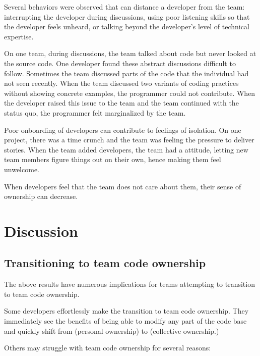 Several behaviors were observed that can distance a developer from the team: interrupting the developer during discussions, using poor listening skills so that the developer feels unheard, or talking beyond the developer's level of technical expertise. 


On one team, during discussions, the team talked about code but never looked at the source code. One developer found these abstract discussions difficult to follow. Sometimes the team discussed parts of the code that the individual had not seen recently. When the team discussed two variants of coding practices without showing concrete examples, the programmer could not contribute. When the developer raised this issue to the team and the team continued with the status quo, the programmer felt marginalized by the team.


Poor onboarding of developers can contribute to feelings of isolation. On one project, there was a time crunch and the team was feeling the pressure to deliver stories. When the team added developers, the team had a  attitude, letting new team members figure things out on their own, hence making them feel unwelcome.


When developers feel that the team does not care about them, their sense of ownership can decrease.


\section{Discussion}
\label{Discussion}
\subsection{Transitioning to team code ownership}
\label{Transitioning}


The above results have numerous implications for teams attempting to transition to team code ownership. 


Some developers effortlessly make the transition to team code ownership. They immediately see the benefits of being able to modify any part of the code base and quickly shift from  (personal ownership) to  (collective ownership.)


Others may struggle with team code ownership for several reasons:


